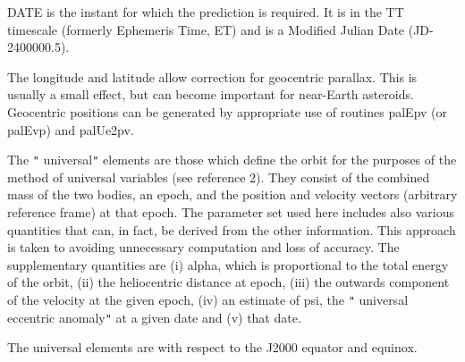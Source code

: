 \documentclass[twoside,11pt,nolof]{starlink}
\begin{document}
{{{         \sstitem
          DATE is the instant for which the prediction is required.  It is
           in the TT timescale (formerly Ephemeris Time, ET) and is a
           Modified Julian Date (JD-2400000.5).

         \sstitem
          The longitude and latitude allow correction for geocentric
           parallax.  This is usually a small effect, but can become
           important for near-Earth asteroids.  Geocentric positions can be
           generated by appropriate use of routines palEpv (or palEvp) and
           palUe2pv.

         \sstitem
          The \texttt{"} universal\texttt{"}  elements are those which define the orbit for the
           purposes of the method of universal variables (see reference 2).
           They consist of the combined mass of the two bodies, an epoch,
           and the position and velocity vectors (arbitrary reference frame)
           at that epoch.  The parameter set used here includes also various
           quantities that can, in fact, be derived from the other
           information.  This approach is taken to avoiding unnecessary
           computation and loss of accuracy.  The supplementary quantities
           are (i) alpha, which is proportional to the total energy of the
           orbit, (ii) the heliocentric distance at epoch, (iii) the
           outwards component of the velocity at the given epoch, (iv) an
           estimate of psi, the \texttt{"} universal eccentric anomaly\texttt{"}  at a given
           date and (v) that date.

         \sstitem
          The universal elements are with respect to the J2000 equator and
           equinox.
      }
   }
}
\end{document}
